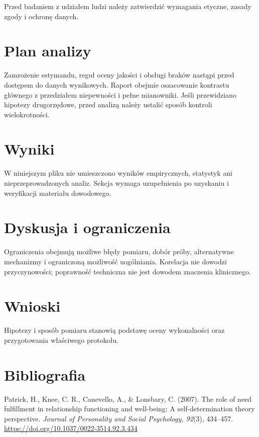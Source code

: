 \documentclass[11pt,a4paper]{article}
\begin{document}
Przed badaniem z udziałem ludzi należy zatwierdzić wymagania etyczne, zasady zgody i ochronę danych.

\section{Plan analizy}

Zamrożenie estymandu, reguł oceny jakości i obsługi braków nastąpi przed dostępem do danych wynikowych. Raport obejmie oszacowanie kontrastu głównego z przedziałem niepewności i pełne mianowniki. Jeśli przewidziano hipotezy drugorzędowe, przed analizą należy ustalić sposób kontroli wielokrotności.

\section{Wyniki}

W niniejszym pliku nie umieszczono wyników empirycznych, statystyk ani nieprzeprowadzonych analiz. Sekcja wymaga uzupełnienia po uzyskaniu i weryfikacji materiału dowodowego.

\section{Dyskusja i ograniczenia}

Ograniczenia obejmują możliwe błędy pomiaru, dobór próby, alternatywne mechanizmy i ograniczoną możliwość uogólniania. Korelacja nie dowodzi przyczynowości; poprawność techniczna nie jest dowodem znaczenia klinicznego.

\section{Wnioski}

Hipotezy i sposób pomiaru stanowią podstawę oceny wykonalności oraz przygotowania właściwego protokołu.

\section*{Bibliografia}

{\setlength{\parindent}{0pt}
\setlength{\parskip}{5pt}
\hangindent=1.27cm
Patrick, H., Knee, C. R., Canevello, A., \& Lonsbary, C. (2007). The role of need fulfillment in relationship functioning and well-being: A self-determination theory perspective. \textit{Journal of Personality and Social Psychology, 92}(3), 434--457. \url{https://doi.org/10.1037/0022-3514.92.3.434}\par
}
\end{document}
